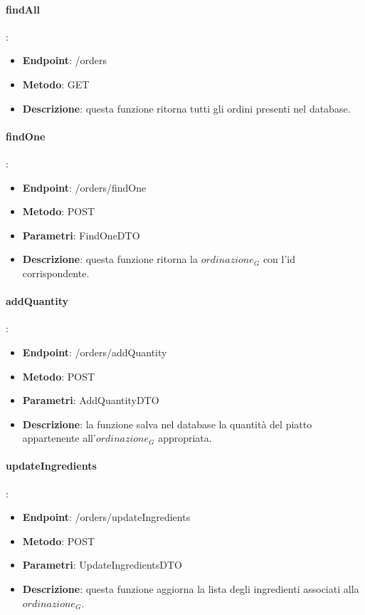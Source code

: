 \paragraph{findAll}:
\begin{itemize}
    \item \textbf{Endpoint}: /orders
    \item \textbf{Metodo}: GET
    \item \textbf{Descrizione}: questa funzione ritorna tutti gli ordini presenti nel database.
\end{itemize}
\paragraph{findOne}:
\begin{itemize}
    \item \textbf{Endpoint}: /orders/findOne
    \item \textbf{Metodo}: POST
    \item \textbf{Parametri}: FindOneDTO
    \item \textbf{Descrizione}: questa funzione ritorna la $\textit{ordinazione}_G$ con l'id corrispondente.
\end{itemize}
\paragraph{addQuantity}:
\begin{itemize}
    \item \textbf{Endpoint}: /orders/addQuantity
    \item \textbf{Metodo}: POST
    \item \textbf{Parametri}: AddQuantityDTO
    \item \textbf{Descrizione}: la funzione salva nel database la quantità del piatto appartenente all'$\textit{ordinazione}_G$ appropriata.
\end{itemize}
\paragraph{updateIngredients}:
\begin{itemize}
    \item \textbf{Endpoint}: /orders/updateIngredients
    \item \textbf{Metodo}: POST
    \item \textbf{Parametri}: UpdateIngredientsDTO
    \item \textbf{Descrizione}: questa funzione aggiorna la lista degli ingredienti associati alla $\textit{ordinazione}_G$.
\end{itemize}
